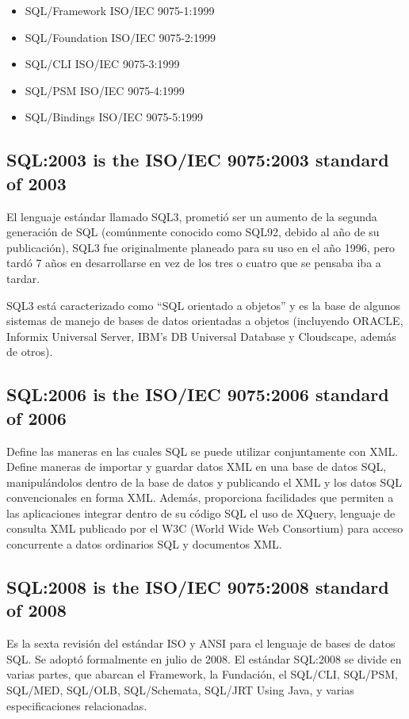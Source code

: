 \documentclass[twoside,twocolumn]{article}
\begin{document}
\begin{itemize}	
	\item SQL/Framework ISO/IEC 9075-1:1999
	\item SQL/Foundation ISO/IEC 9075-2:1999
	\item SQL/CLI ISO/IEC 9075-3:1999
	\item SQL/PSM ISO/IEC 9075-4:1999
	\item SQL/Bindings ISO/IEC 9075-5:1999
\end{itemize}

\subsection{SQL:2003 is the ISO/IEC 9075:2003 standard of 2003}
El lenguaje estándar llamado SQL3, prometió ser un aumento de la segunda generación de SQL (comúnmente conocido como SQL92, debido al año de su publicación), SQL3 fue originalmente planeado para su uso en el año 1996, pero tardó 7 años en desarrollarse en vez de los tres o cuatro que se pensaba iba a tardar.

SQL3 está caracterizado como “SQL orientado a objetos” y es la base de algunos sistemas de manejo de bases de datos orientadas a objetos (incluyendo ORACLE, Informix Universal Server, IBM’s DB Universal Database y Cloudscape, además de otros).


\subsection{SQL:2006 is the ISO/IEC 9075:2006 standard of 2006}
Define las maneras en las cuales SQL se puede utilizar conjuntamente con XML. Define maneras de importar y guardar datos XML en una base de datos SQL, manipulándolos dentro de la base de datos y publicando el XML y los datos SQL convencionales en forma XML. Además, proporciona facilidades que permiten a las aplicaciones integrar dentro de su código SQL el uso de XQuery, lenguaje de consulta XML publicado por el W3C (World Wide Web Consortium) para acceso concurrente a datos ordinarios SQL y documentos XML.

\subsection{SQL:2008 is the ISO/IEC 9075:2008 standard of 2008}
Es la sexta revisión del estándar ISO y ANSI para el lenguaje de bases de datos SQL. Se adoptó formalmente en julio de 2008.
El estándar SQL:2008 se divide en varias partes, que abarcan el Framework, la Fundación, el SQL/CLI, SQL/PSM, SQL/MED, SQL/OLB, SQL/Schemata, SQL/JRT Using Java, y varias especificaciones relacionadas.
\end{document}
